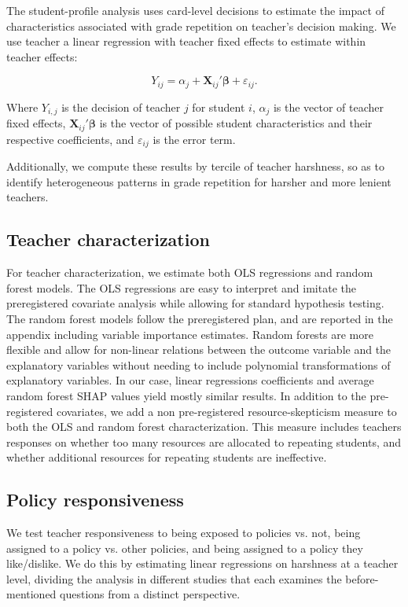 \documentclass[12pt,a4paper]{article}
\begin{document}
The student-profile analysis uses card-level decisions to estimate the impact of characteristics associated with grade repetition on teacher's decision making. We use teacher a linear regression with teacher fixed effects to estimate within teacher effects:

\[
Y_{ij} = \alpha_j + \boldsymbol{X}_{ij}'\boldsymbol{\beta} + \varepsilon_{ij}.
\]

Where $Y_{i,j}$ is the decision of teacher $j$ for student $i$, $\alpha_j$ is the vector of teacher fixed effects, $\boldsymbol{X}_{ij}'\boldsymbol{\beta}$ is the vector of possible student characteristics and their respective coefficients, and $\varepsilon_{ij}$ is the error term.

Additionally, we compute these results by tercile of teacher harshness, so as to identify heterogeneous patterns in grade repetition for harsher and more lenient teachers. 


\subsection{Teacher characterization}

For teacher characterization, we estimate both OLS regressions and random forest models. The OLS regressions are easy to interpret and imitate the preregistered covariate analysis while allowing for standard hypothesis testing. The random forest models follow the preregistered plan, and are reported in the appendix including variable importance estimates. Random forests are more flexible and allow for non-linear relations between the outcome variable and the explanatory variables without needing to include polynomial transformations of explanatory variables. In our case, linear regressions coefficients and average random forest SHAP values yield mostly similar results. In addition to the pre-registered covariates, we add a non pre-registered resource-skepticism measure to both the OLS and random forest characterization. This measure includes teachers responses on whether too many resources are allocated to repeating students, and whether additional resources for repeating students are ineffective.

\subsection{Policy responsiveness}

We test teacher responsiveness to being exposed to policies vs. not, being assigned to a policy vs. other policies, and  being assigned to a policy they like/dislike. We do this by estimating linear regressions on harshness at a teacher level, dividing the analysis in different studies that each examines the before-mentioned questions from a distinct perspective.
\end{document}
